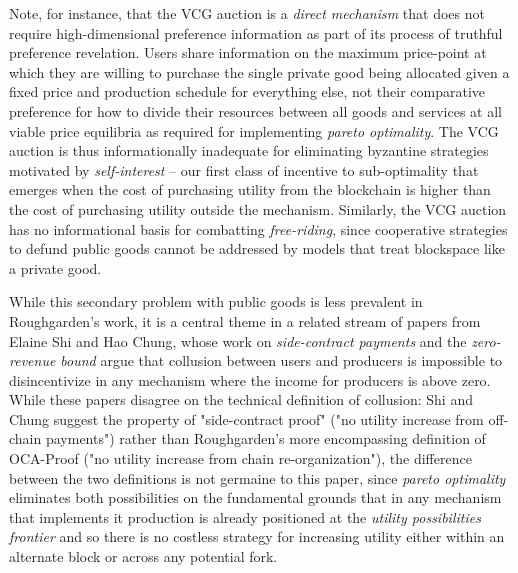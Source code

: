 Note, for instance, that the VCG auction is a \textit{direct mechanism} that does not require high-dimensional preference information as part of its process of truthful preference revelation. Users share information on the maximum price-point at which they are willing to purchase the single private good being allocated given a fixed price and production schedule for everything else, not their comparative preference for how to divide their resources between all goods and services at all viable price equilibria as required for implementing \textit{pareto optimality}. The VCG auction is thus informationally inadequate for eliminating byzantine strategies motivated by \textit{self-interest} -- our first class of incentive to sub-optimality that emerges when the cost of purchasing utility from the blockchain is higher than the cost of purchasing utility outside the mechanism. Similarly, the VCG auction has no informational basis for combatting \textit{free-riding}, since cooperative strategies to defund public goods cannot be addressed by models that treat blockspace like a private good.

While this secondary problem with public goods is less prevalent in Roughgarden's work, it is a central theme in a related stream of papers from Elaine Shi and Hao Chung, whose work on \textit{side-contract payments} and the \textit{zero-revenue bound} argue that collusion between users and producers is impossible to disincentivize in any mechanism where the income for producers is above zero. While these papers disagree on the technical definition of collusion: Shi and Chung suggest the property of "side-contract proof" ("no utility increase from off-chain payments") rather than Roughgarden's more encompassing definition of OCA-Proof ("no utility increase from chain re-organization"), the difference between the two definitions is not germaine to this paper, since \textit{pareto optimality} eliminates both possibilities on the fundamental grounds that in any mechanism that implements it production is already positioned at the \textit{utility possibilities frontier} and so there is no costless strategy for increasing utility either within an alternate block or across any potential fork.


